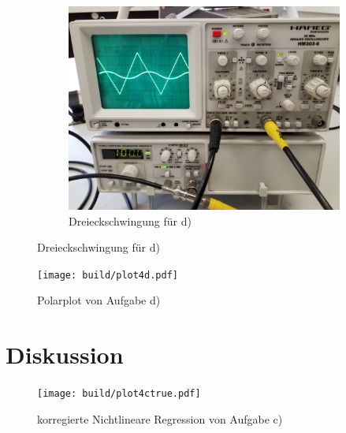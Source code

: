 \begin{figure}[H]
\begin{subfigure}{0.48\linewidth}
      \includegraphics[width=\textwidth]{images/dreieck.jpg}
      \centering
      \caption{Dreieckschwingung für d)}  
    \end{subfigure}
  \end{figure}



  \begin{figure}[H]
    \texttt{[image: build/plot4d.pdf]}
    \centering
    \caption{Polarplot von Aufgabe d)}
    \label{fig:4d}
  \end{figure}

  


\section{Diskussion}


  \begin{figure}[H]
    \texttt{[image: build/plot4ctrue.pdf]}
    \centering
    \caption{korregierte Nichtlineare Regression von Aufgabe c)}
    \label{fig:4ctrue}
  \end{figure}

\newpage
\nocite{V353}
\nocite{scipy}
\nocite{uncertainties}
\printbibliography
